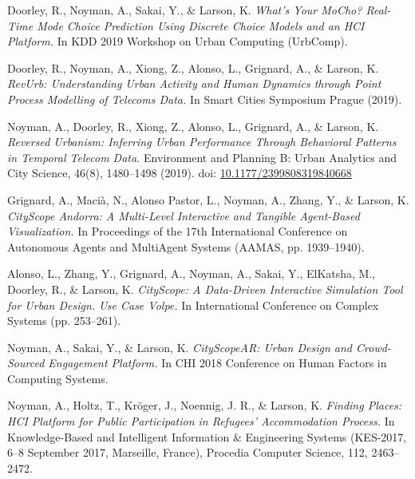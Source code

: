 \begin{tablist}
    \item[2019] \tab
    Doorley, R., Noyman, A., Sakai, Y., \& Larson, K.
    \textit{What's Your MoCho? Real-Time Mode Choice Prediction Using Discrete Choice Models and an HCI Platform.}
    In KDD 2019 Workshop on Urban Computing (UrbComp).

    \item[2019] \tab
    Doorley, R., Noyman, A., Xiong, Z., Alonso, L., Grignard, A., \& Larson, K.
    \textit{RevUrb: Understanding Urban Activity and Human Dynamics through Point Process Modelling of Telecoms Data.}
    In Smart Cities Symposium Prague (2019).

    \item[2019] \tab
    Noyman, A., Doorley, R., Xiong, Z., Alonso, L., Grignard, A., \& Larson, K.
    \textit{Reversed Urbanism: Inferring Urban Performance Through Behavioral Patterns in Temporal Telecom Data.}
    Environment and Planning B: Urban Analytics and City Science, 46(8), 1480--1498 (2019).
    doi: \href{https://doi.org/10.1177/2399808319840668}{10.1177/2399808319840668}

    \item[2018] \tab
    Grignard, A., Macià, N., Alonso Pastor, L., Noyman, A., Zhang, Y., \& Larson, K.
    \textit{CityScope Andorra: A Multi-Level Interactive and Tangible Agent-Based Visualization.}
    In Proceedings of the 17th International Conference on Autonomous Agents and MultiAgent Systems (AAMAS, pp. 1939--1940).

    \item[2018] \tab
    Alonso, L., Zhang, Y., Grignard, A., Noyman, A., Sakai, Y., ElKatsha, M., Doorley, R., \& Larson, K.
    \textit{CityScope: A Data-Driven Interactive Simulation Tool for Urban Design. Use Case Volpe.}
    In International Conference on Complex Systems (pp. 253--261).

    \item[2018] \tab
    Noyman, A., Sakai, Y., \& Larson, K.
    \textit{CityScopeAR: Urban Design and Crowd-Sourced Engagement Platform.}
    In CHI 2018 Conference on Human Factors in Computing Systems.

    \item[2017] \tab
    Noyman, A., Holtz, T., Kröger, J., Noennig, J. R., \& Larson, K.
    \textit{Finding Places: HCI Platform for Public Participation in Refugees' Accommodation Process.}
    In Knowledge-Based and Intelligent Information \& Engineering Systems (KES-2017, 6--8 September 2017, Marseille, France), Procedia Computer Science, 112, 2463--2472.


\end{tablist}
